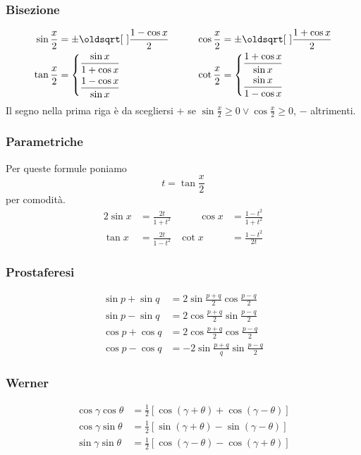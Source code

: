 \subsubsection{Bisezione}
\begin{alignat*}{2}
  \sin\frac{x}{2}&=\pm\sqrt{\frac{1-\cos x}{2}} &\qquad \cos\frac{x}{2}&=\pm\sqrt{\frac{1+\cos x}{2}}\\
  \tan\frac{x}{2}&=\begin{dcases}
    \frac{\sin x}{1+\cos x}\\
    \frac{1-\cos x}{\sin x}
  \end{dcases} & \cot\frac{x}{2} &= \begin{dcases}
    \frac{1+\cos x}{\sin x}\\
    \frac{\sin x}{1-\cos x}
  \end{dcases}
\end{alignat*}
Il segno nella prima riga è da scegliersi $+$ se 
$\sin\frac{x}{2}\geq0\lor\cos\frac{x}{2}\geq0$, $-$ altrimenti.

\subsubsection{Parametriche}
Per queste formule poniamo
\begin{equation*}
  t = \tan\frac{x}{2}
\end{equation*}
per comodità.
\begin{alignat*}{2}
  \sin x &= \frac{2t}{1+t^2} &\qquad \cos x &= \frac{1-t^2}{1+t^2}\\
  \tan x &= \frac{2t}{1-t^2} & \cot x &= \frac{1-t^2}{2t}
\end{alignat*}

\subsubsection{Prostaferesi}
\begin{align*}
  \sin p + \sin q &= 2\sin\frac{p+q}{2}\cos\frac{p-q}{2}\\
  \sin p-\sin q &=2\cos\frac{p+q}{2}\sin\frac{p-q}{2}\\
  \cos p+\cos q&=2\cos\frac{p+q}{2}\cos\frac{p-q}{2}\\
  \cos p-\cos q&=-2\sin\frac{p+q}{q}\sin\frac{p-q}{2}
\end{align*}

\subsubsection{Werner}
\begin{align*}
  \cos\gamma\cos\theta &= \frac{1}{2}[\cos(\gamma+\theta)+\cos(\gamma-\theta)]\\
  \cos\gamma\sin\theta &= \frac{1}{2}[\sin(\gamma+\theta)-\sin(\gamma-\theta)]\\
  \sin\gamma\sin\theta &= \frac{1}{2}[\cos(\gamma-\theta)-\cos(\gamma+\theta)]
\end{align*}

